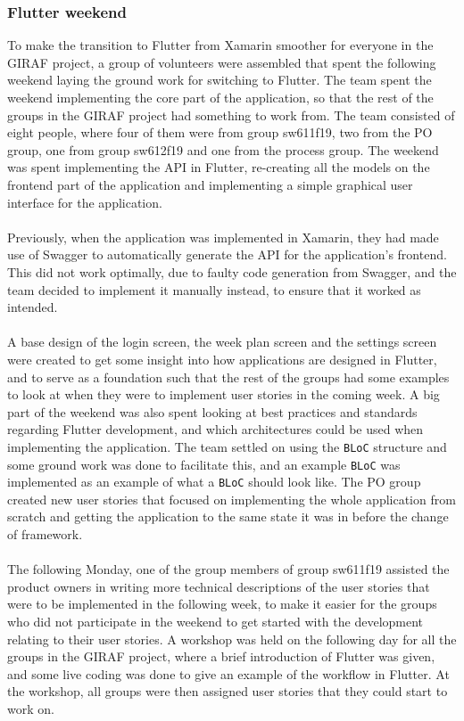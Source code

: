 \subsubsection{Flutter weekend}
To make the transition to Flutter from Xamarin smoother for everyone in the GIRAF project, a group of volunteers were assembled that spent the following weekend laying the ground work for switching to Flutter. 
The team spent the weekend implementing the core part of the application, so that the rest of the groups in the GIRAF project had something to work from. 
The team consisted of eight people, where four of them were from group sw611f19, two from the PO group, one from group sw612f19 and one from the process group.
The weekend was spent implementing the API in Flutter, re-creating all the models on the frontend part of the application and implementing a simple graphical user interface for the application.
\\\\
Previously, when the application was implemented in Xamarin, they had made use of Swagger to automatically generate the API for the application's frontend.
This did not work optimally, due to faulty code generation from Swagger, and the team decided to implement it manually instead, to ensure that it worked as intended.
\\\\
A base design of the login screen, the week plan screen and the settings screen were created to get some insight into how applications are designed in Flutter, and to serve as a foundation such that the rest of the groups had some examples to look at when they were to implement user stories in the coming week.
A big part of the weekend was also spent looking at best practices and standards regarding Flutter development, and which architectures could be used when implementing the application.
The team settled on using the \texttt{BLoC} structure and some ground work was done to facilitate this, and an example \texttt{BLoC} was implemented as an example of what a \texttt{BLoC} should look like.
The PO group created new user stories that focused on implementing the whole application from scratch and getting the application to the same state it was in before the change of framework.
\\\\
The following Monday, one of the group members of group sw611f19 assisted the product owners in writing more technical descriptions of the user stories that were to be implemented in the following week, to make it easier for the groups who did not participate in the weekend to get started with the development relating to their user stories.
A workshop was held on the following day for all the groups in the GIRAF project, where a brief introduction of Flutter was given, and some live coding was done to give an example of the workflow in Flutter.
At the workshop, all groups were then assigned user stories that they could start to work on.

